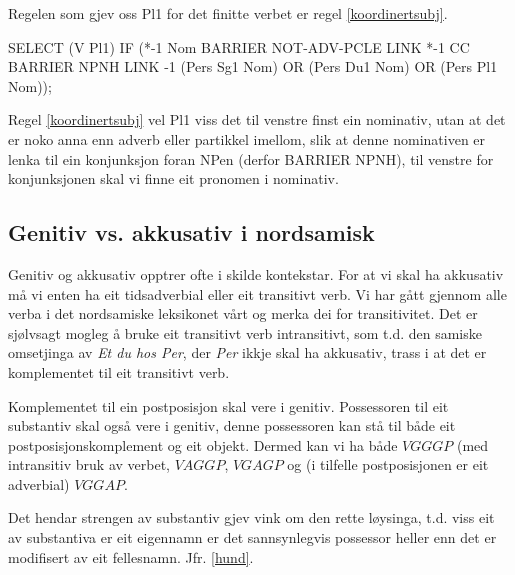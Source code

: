 \documentclass[a4paper,nynorsk]{article}
\begin{document}
 
Regelen som gjev oss Pl1 for det finitte verbet er regel  \ref{koordinertsubj}. %
 
\begin{example}\label{koordinertsubj}
SELECT (V Pl1) IF (*-1 Nom BARRIER NOT-ADV-PCLE LINK *-1 CC BARRIER NPNH
	LINK -1 (Pers Sg1 Nom) OR (Pers Du1 Nom) OR (Pers Pl1 Nom));
\end{example}%

Regel \ref{koordinertsubj} vel Pl1 viss det til venstre finst ein nominativ, utan at det er noko anna enn adverb eller partikkel imellom, slik at denne nominativen er lenka til ein konjunksjon foran NPen (derfor BARRIER NPNH), til venstre for konjunksjonen skal vi finne eit pronomen i nominativ. %





\subsection{Genitiv vs. akkusativ i nordsamisk}

Genitiv og akkusativ opptrer ofte i skilde kontekstar. For at vi skal ha akkusativ må vi enten ha eit tidsadverbial eller eit transitivt verb. Vi har gått gjennom alle verba i det nordsamiske leksikonet vårt og merka dei for transitivitet. Det er sjølvsagt mogleg å bruke eit transitivt  verb intransitivt, som t.d. den samiske omsetjinga av \textit{Et du hos Per}, der \textit{Per} ikkje skal ha akkusativ, trass i at det er komplementet til eit transitivt verb. %

Komplementet til ein postposisjon skal vere i genitiv. Possessoren til eit substantiv skal også vere i genitiv, denne possessoren kan stå til både eit postposisjonskomplement og eit objekt. Dermed kan vi ha både $VGGGP$ (med intransitiv bruk av verbet, $VAGGP$, $VGAGP$ og (i tilfelle postposisjonen er eit adverbial) $VGGAP$. %

Det hendar strengen av substantiv gjev vink om den rette løysinga, t.d. viss eit av substantiva er eit eigennamn er det sannsynlegvis possessor heller enn det er modifisert av eit fellesnamn. Jfr. \ref{hund}. %
\end{document}

